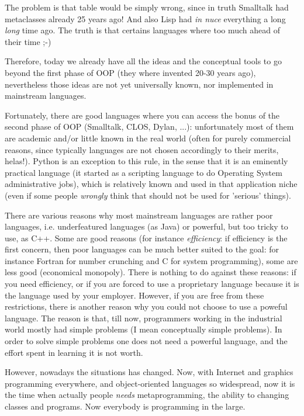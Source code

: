 \documentclass[10pt,english]{article}
\begin{document}
The problem is that table would be simply wrong, since in truth
Smalltalk had metaclasses already 25 years ago! And also Lisp
had \emph{in nuce} everything a long \emph{long} time ago.
The truth is that certains languages where too much ahead of their 
time ;-)

Therefore, today we already have all the ideas 
and the conceptual tools to go beyond the first phase of OOP 
(they where invented 20-30 years ago), nevertheless those ideas are  
not yet universally known, nor implemented in mainstream languages.

Fortunately, there are good languages
where you can access the bonus of the second phase of OOP (Smalltalk, CLOS,
Dylan, ...): unfortunately
most of them are academic and/or little known in the real world
(often for purely commercial reasons, since typically languages are not
chosen accordingly to their merits, helas!). Python is an exception to this
rule, in the sense that it is an eminently practical language (it started
as a scripting language to do Operating System administrative jobs), 
which is relatively known and used in that application niche (even if some
people \emph{wrongly} think that should not be used for 'serious' things).

There are various reasons why most mainstream languages are rather
poor languages, i.e. underfeatured languages (as Java) or powerful, but too
tricky to use, as C++. Some are good reasons (for instance \emph{efficiency}: if
efficiency is the first concern, then poor languages can be much
better suited to the goal: for instance Fortran for number crunching
and C for system programming), some are less good (economical 
monopoly). There is nothing to do against these reasons: if you
need efficiency, or if you are forced to use a proprietary language
because it is the language used by your employer. However, if you
are free from these restrictions, there is another reason why you
could not choose to use a poweful language. The reason is that, 
till now, programmers working in the industrial world mostly had simple 
problems (I mean conceptually simple problems). In order to solve
simple problems one does not need a powerful language, and the effort
spent in learning it is not worth.

However, nowadays the situations has changed. Now, with Internet and graphics
programming everywhere, and object-oriented languages so widespread,
now it is the time when actually people \emph{needs} metaprogramming, the
ability to changing classes and programs. Now everybody is programming
in the large.
\end{document}
